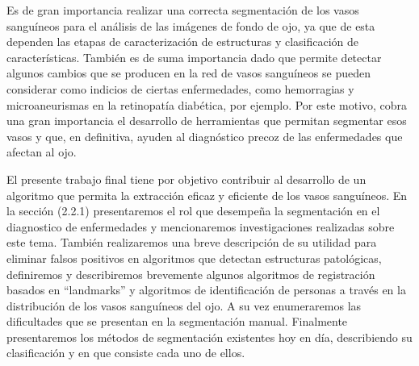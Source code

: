 Es de gran importancia realizar una correcta segmentaci\'on de los vasos sangu\'ineos para el an\'alisis de las im\'agenes de fondo de ojo, ya que de esta dependen las etapas de caracterizaci\'on de estructuras y clasificaci\'on de caracter\'isticas.  Tambi\'en es de suma importancia dado que permite detectar algunos cambios que se producen en la red de vasos sangu\'ineos se pueden considerar como indicios de ciertas enfermedades, como hemorragias y microaneurismas en la retinopat\'ia diab\'etica, por ejemplo. Por este motivo, cobra una gran importancia el desarrollo de herramientas que permitan segmentar esos vasos y que, en definitiva, ayuden al diagn\'ostico precoz de las enfermedades que afectan al ojo.

El presente trabajo final tiene por objetivo contribuir al desarrollo de un algoritmo que permita la extracci\'on eficaz y eficiente de los vasos sangu\'ineos. 
En la sección (2.2.1) presentaremos el rol que desempeña la segmentaci\'on en el diagnostico de enfermedades y mencionaremos investigaciones realizadas sobre este tema.  Tambi\'en realizaremos una breve descripci\'on de su utilidad para eliminar falsos positivos en algoritmos que detectan estructuras patol\'ogicas, definiremos y describiremos brevemente algunos algoritmos de registraci\'on basados en “landmarks” y algoritmos de identificaci\'on de personas a trav\'es en la distribuci\'on de los vasos sangu\'ineos del ojo.  A su vez enumeraremos las dificultades que se presentan en la segmentaci\'on manual. Finalmente presentaremos los m\'etodos de segmentaci\'on existentes hoy en d\'ia, describiendo su clasificaci\'on y en que consiste cada uno de ellos.




